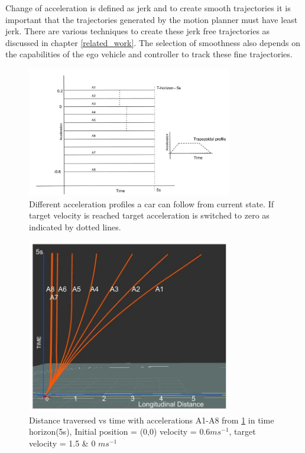 Change of acceleration is defined as jerk and to create smooth trajectories it is important that the trajectories generated by the motion planner must have least jerk. There are various techniques to create these jerk free trajectories as discussed in chapter \ref{related_work}. The selection of smoothness also depends on the capabilities of the ego vehicle and controller to track these fine trajectories.
 
 \begin{figure}
    \centering
    \includegraphics[width=0.8\textwidth]{Images/accelerations2.jpg}
    \caption{Different acceleration profiles a car can follow from current state. If target velocity is reached target acceleration is switched to zero as indicated by dotted lines.}
    \label{accelerations}
\end{figure}

 \begin{figure}
    \centering
    \includegraphics[width=0.8\textwidth]{Images/concept/distvstime2.jpg}
    \caption{Distance traversed vs time with accelerations A1-A8 from \ref{accelerations} in time horizon(5s), Initial position = (0,0) velocity = 0.6$ms^{-1}$, target velocity = 1.5 \& 0 $ms^{-1}$}
    \label{distances}
\end{figure}

